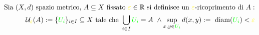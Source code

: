 \documentclass[preview]{standalone}
\begin{document}
\begin{align*}
\text{Sia } (X, d) \text{ spazio metrico, } A \subseteq X \text{ fissato } \textcolor{yellow}{\varepsilon} \in \mathbb{R} \text{ si definisce un } \textcolor{yellow}{\varepsilon}\text{-ricoprimento di } A: \\ \mathcal{U}_{\textcolor{yellow}{\varepsilon}}(A) :=  \{\textcolor{green}{U_i}\}_{i \in I} \subseteq X \text{ tale che } \bigcup_{i \in I} \textcolor{green}{U_i} = A  \ \land \sup_{x,y \in \textcolor{green}{U_i}} d(x,y) := \text{ diam}(\textcolor{green}{U_i}) < \textcolor{yellow}{\varepsilon}
\end{align*}
\end{document}
